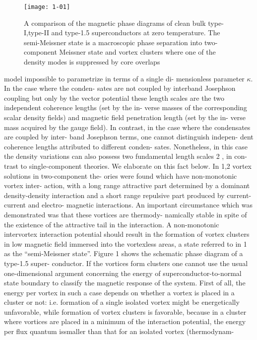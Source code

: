 \begin{figure}[h!]
  \texttt{[image: 1-01]}
  \caption{A comparison of the magnetic phase diagrams of
    clean bulk type-I,type-II and type-1.5 superconductors at
    zero temperature. The semi-Meissner state is a macroscopic
    phase separation into two-component Meissner state and vortex
    clusters where one of the density modes is suppressed by
    core overlaps}
\end{figure}


model impossible to parametrize in terms of a single di-
mensionless parameter \( \kappa \). In the case where the conden-
sates are not coupled by interband Josephson coupling
but only by the vector potential these length scales are
the two independent coherence lengths (set by the in-
verse masses of the corresponding scalar density fields)
and magnetic field penetration length (set by the in-
verse mass acquired by the gauge field). In contrast,
in the case where the condensates are coupled by inter-
band Josephson terms, one cannot distinguish indepen-
dent coherence lengths attributed to different conden-
sates. Nonetheless, in this case the density variations
can also possess two fundamental length scales 2 , in con-
trast to single-component theories. We elaborate on this
fact below. In 1,2 vortex solutions in two-component the-
ories were found which have non-monotonic vortex inter-
action, with a long range attractive part determined by
a dominant density-density interaction and a short range
repulsive part produced by current-current and electro-
magnetic interactions. An important circumstance which
was demonstrated was that these vortices are thermody-
namically stable in spite of the existence of the attractive
tail in the interaction.
A non-monotonic intervortex interaction potential
should result in the formation of vortex clusters in low
magnetic field immersed into the vortexless areas, a state
referred to in 1 as the “semi-Meissner state”. Figure 1
shows the schematic phase diagram of a type-1.5 super-
conductor.
If the vortices form clusters one cannot use the
usual one-dimensional argument concerning the energy
of superconductor-to-normal state boundary to classify
the magnetic response of the system. First of all, the
energy per vortex in such a case depends on whether a
vortex is placed in a cluster or not: i.e. formation of a
single isolated vortex might be energetically unfavorable,
while formation of vortex clusters is favorable, because
in a cluster where vortices are placed in a minimum of
the interaction potential, the energy per flux quantum issmaller than that for an isolated vortex (thermodynam-
